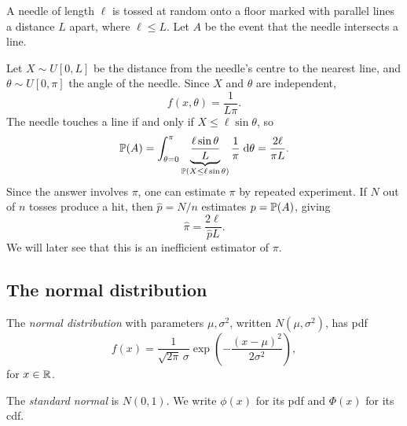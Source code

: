 \documentclass[a4paper]{article}
\begin{document}
\begin{eg}
  A needle of length $\ell$ is tossed at random onto a floor marked with parallel lines a distance $L$ apart, where $\ell \leq L$.
  Let $A$ be the event that the needle intersects a line.
  \begin{center}
  \end{center}
  Let $X \sim U[0, L]$ be the distance from the needle's centre to the nearest line, and $\theta \sim U[0, \pi]$ the angle of the needle.
  Since $X$ and $\theta$ are independent,
  \[
    f(x, \theta) = \frac{1}{L\pi}.
  \]
  The needle touches a line if and only if $X \leq \ell \sin \theta$, so
  \[
    \P(A) = \int_{\theta = 0}^\pi \underbrace{\frac{\ell \sin \theta}{L}}_{\P(X \leq \ell \sin \theta)} \frac{1}{\pi}\;\d \theta = \frac{2\ell}{\pi L}.
  \]
  Since the answer involves $\pi$, one can estimate $\pi$ by repeated experiment.
  If $N$ out of $n$ tosses produce a hit, then $\hat{p} = N/n$ estimates $p = \P(A)$, giving
  \[
    \hat{\pi} = \frac{2\ell}{\hat{p}L}.
  \]
  We will later see that this is an inefficient estimator of $\pi$.
\end{eg}
\subsection{The normal distribution}
\begin{defi}
  The \emph{normal distribution} with parameters $\mu, \sigma^2$, written $N(\mu, \sigma^2)$, has pdf
  \[
    f(x) = \frac{1}{\sqrt{2\pi}\,\sigma}\exp\left(-\frac{(x - \mu)^2}{2\sigma^2}\right),
  \]
  for $x \in \R$.
  \begin{center}
  \end{center}
  The \emph{standard normal} is $N(0, 1)$.
  We write $\phi(x)$ for its pdf and $\Phi(x)$ for its cdf.
\end{defi}
\end{document}
